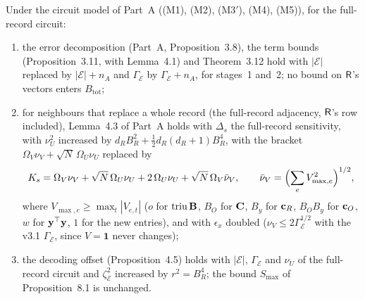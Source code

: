 \begin{lemma}\label{lem:S10e}
Under the circuit model of Part~A ((M1), (M2), (M3$'$), (M4), (M5)), for the full-record circuit:
\begin{enumerate}[nosep,label=(\alph*)]
  \item the error decomposition (Part~A, Proposition~3.8), the term bounds (Proposition~3.11, with Lemma~4.1) and Theorem~3.12 hold with $|\mathcal E|$ replaced by $|\mathcal E|+n_A$ and $\Gamma_{\mathcal E}$ by $\Gamma_{\mathcal E}+n_A$, for stages~1 and~2; no bound on $\mathsf{R}$'s vectors enters $B_{\mathrm{tot}}$;
  \item for neighbours that replace a whole record (the full-record adjacency, $\mathsf{R}$'s row included), Lemma~4.3 of Part~A holds with $\Delta_s$ the full-record sensitivity, with $\nu_U^2$ increased by $d_RB_R^2+\tfrac12d_R(d_R+1)B_R^4$, with the bracket $\Omega_V\nu_V+\sqrt N\,\Omega_U\nu_U$ replaced by
  \[
    K_s=\Omega_V\nu_V+\sqrt N\,\Omega_U\nu_U+2\,\Omega_U\nu_U+\sqrt N\,\Omega_V\bar\nu_V,\qquad \bar\nu_V=\Bigl(\sum_{e}V_{\max,e}^2\Bigr)^{1/2},
  \]
  where $V_{\max,e}\ge\max_t|V_{e,t}|$ ($o$ for $\operatorname{triu}\mathbf{B}$, $B_O$ for $\mathbf{C}$, $B_y$ for $\mathbf{c}_R$, $B_OB_y$ for $\mathbf{c}_O$, $w$ for $\mathbf{y}^\top\mathbf{y}$, $1$ for the new entries), and with $\epsilon_x$ doubled ($\nu_V\le2\Gamma_{\mathcal E}^{1/2}$ with the v3.1 $\Gamma_{\mathcal E}$, since $V=\mathbf 1$ never changes);
  \item the decoding offset (Proposition~4.5) holds with $|\mathcal E|$, $\Gamma_{\mathcal E}$ and $\nu_U$ of the full-record circuit and $\zeta^2_{\mathcal E}$ increased by $r^2=B_R^4$; the bound $S_{\max}$ of Proposition~8.1 is unchanged.
\end{enumerate}
\end{lemma}
